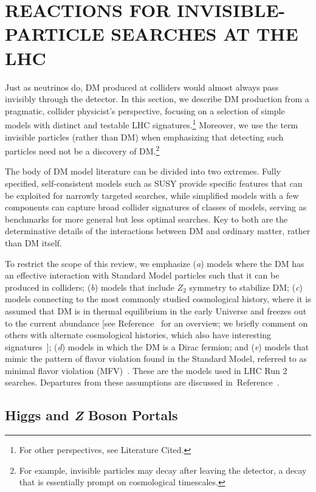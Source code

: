 \documentclass{ar-1col}
\newcommand{\IP}{invisible particle}
\begin{document}
{\section{REACTIONS FOR INVISIBLE-PARTICLE SEARCHES AT THE LHC}\label{sec:02_Reactions}

Just as neutrinos do, 
DM produced at colliders would almost always pass invisibly through the detector. 
In this section, we describe DM
production from a pragmatic, collider physicist's perspective,
focusing on a selection of simple models with distinct and
testable LHC signatures.\footnote{For other perspectives, see Literature Cited.} Moreover, we use the term {invisible
particles} (rather than DM) when emphasizing that detecting such
particles need not be a discovery of DM.\footnote{For example,
{\IP}s may decay after leaving the detector, a decay that is
essentially prompt on cosmological timescales.}

The body of DM model literature can be divided into two extremes.
Fully specified, self-consistent models such as SUSY provide
specific features that can be exploited for narrowly targeted
searches, while simplified models with a few components can
capture broad collider signatures of classes of models, serving as
benchmarks for more general but less optimal searches. Key to both
are the determinative details of the interactions between DM
and ordinary matter, rather than DM itself.

To restrict the scope of this review, we emphasize 
(\textit{a}) models where the DM has an effective interaction with Standard Model particles
such that it can be produced in colliders; 
(\textit{b}) models that include $Z_2$ symmetry to stabilize DM; 
(\textit{c}) models connecting to the most commonly studied cosmological history, 
where it is assumed that DM is in thermal equilibrium in the
early Universe and freezes out to the current abundance [see Reference~ for an overview; we briefly comment on others with alternate cosmological histories, which also
have interesting signatures~\cite{Bernal:2017kxu,Brooijmans:2018xbu,Evans:2017kti}]; 
(\textit{d}) models in which the DM is a Dirac fermion; and
(\textit{e}) models that mimic the pattern of flavor violation found in the Standard Model, 
referred to as minimal flavor violation (MFV)~\cite{DAmbrosio:2002vsn}. 
These are the models used in LHC Run 2 searches. 
Departures from these assumptions are discussed in~Reference~.

\subsection{Higgs and {\bf \it{Z}} Boson Portals}\label{sec:HZPortalModels}

}
\end{document}
